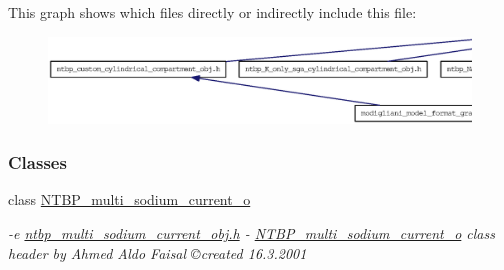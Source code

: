 This graph shows which files directly or indirectly include this file:
\nopagebreak
\begin{figure}[H]
\begin{center}
\leavevmode
\includegraphics[width=400pt]{ntbp__multi__sodium__current__obj_8h__dep__incl}
\end{center}
\end{figure}
\subsubsection*{Classes}
\begin{DoxyCompactItemize}
\item 
class \hyperlink{class_n_t_b_p__multi__sodium__current__o}{NTBP\_\-multi\_\-sodium\_\-current\_\-o}
\begin{DoxyCompactList}\small\item\em -\/e \hyperlink{ntbp__multi__sodium__current__obj_8h}{ntbp\_\-multi\_\-sodium\_\-current\_\-obj.h} -\/ \hyperlink{class_n_t_b_p__multi__sodium__current__o}{NTBP\_\-multi\_\-sodium\_\-current\_\-o} class header by Ahmed Aldo Faisal \copyright created 16.3.2001 \item\end{DoxyCompactList}\end{DoxyCompactItemize}
